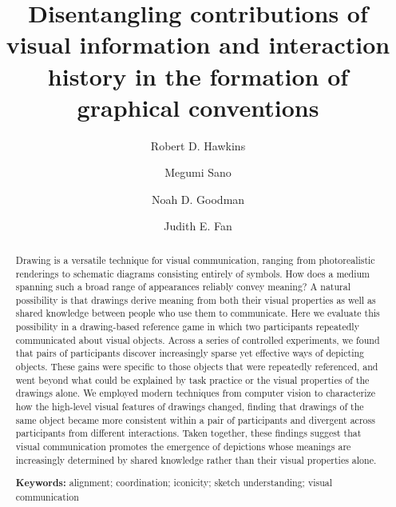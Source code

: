 \documentclass[11pt,letterpaper]{article}
\title{Disentangling contributions of visual information and interaction history in the formation of graphical conventions}
\date{}
\author[a,d]{Robert D. Hawkins}
\author[a]{Megumi Sano}
\author[a,b]{Noah D. Goodman}
\author[a,c]{Judith E. Fan}
\affil[a]{Department of Psychology, Stanford University}
\affil[b]{Department of Computer Science, Stanford University}
\affil[c]{Department of Psychology, University of California, San Diego}
\affil[d]{Department of Psychology, Princeton University}
\begin{document}
\maketitle

\begin{abstract}
Drawing is a versatile technique for visual communication, ranging from photorealistic renderings to schematic diagrams consisting entirely of symbols.
How does a medium spanning such a broad range of appearances reliably convey meaning?
A natural possibility is that drawings derive meaning from both their visual properties as well as shared knowledge between people who use them to communicate.
Here we evaluate this possibility in a drawing-based reference game in which two participants repeatedly communicated about visual objects.
Across a series of controlled experiments, we found that pairs of participants discover increasingly sparse yet effective ways of depicting objects.
These gains were specific to those objects that were repeatedly referenced, and went beyond what could be explained by task practice or the visual properties of the drawings alone.
We employed modern techniques from computer vision to characterize how the high-level visual features of drawings changed, finding that drawings of the same object became more consistent within a pair of participants and divergent across participants from different interactions.
Taken together, these findings suggest that visual communication promotes the emergence of depictions whose meanings are increasingly determined by shared knowledge rather than their visual properties alone.

\textbf{Keywords:}
alignment; coordination; iconicity; sketch understanding; visual communication


\end{abstract}
\end{document}
